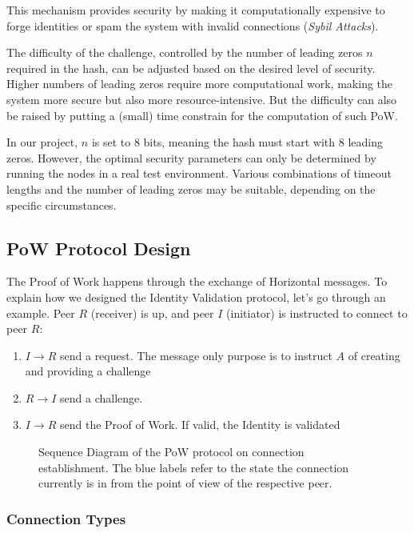 \documentclass[a4paper,english,10pt,NET]{tumarticle}
\begin{document}
This mechanism provides security by making it computationally expensive to forge identities or spam the system with invalid connections (\textit{Sybil Attacks}). 

The difficulty of the challenge, controlled by the number of leading zeros $n$ required in the hash, can be adjusted based on the desired level of security. Higher numbers of leading zeros require more computational work, making the system more secure but also more resource-intensive. But the difficulty can also be raised by putting a (small) time constrain for the computation of such PoW.

In our project, $n$ is set to 8 bits, meaning the hash must start with 8 leading zeros. However, the optimal security parameters can only be determined by running the nodes in a real test environment. Various combinations of timeout lengths and the number of leading zeros may be suitable, depending on the specific circumstances.

\subsection{PoW Protocol Design}

The Proof of Work happens through the exchange of Horizontal messages. To explain how we designed the Identity Validation protocol, let's go through an example. Peer $R$ (receiver) is up, and peer $I$ (initiator) is instructed to connect to peer $R$:

\begin{enumerate}
	\item $I \to R$ send a request. The message only purpose is to instruct $A$ of creating and providing a challenge
	\item $R \to I$ send a challenge. 
	\item $I \to R$ send the Proof of Work. If valid, the Identity is validated
\end{enumerate}

\begin{figure}
	\centering
	
	\caption{
		Sequence Diagram of the PoW protocol on connection establishment.
		The \textcolor{TUMBlue}{blue labels} refer to the state the connection currently is in from the point of view of the respective peer.
	}
	\label{fig:seqPow}
\end{figure}
\subsubsection{Connection Types}
\end{document}
